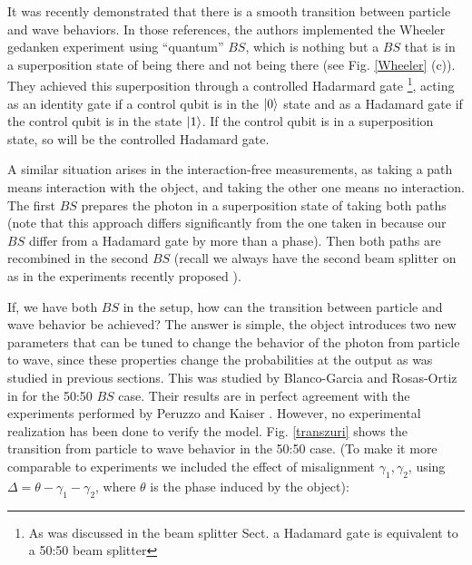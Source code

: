 \documentclass[12pt]{book}
\begin{document}
It was recently demonstrated \cite{Peruzzo, Kaiser2012} that there is a smooth transition between particle and wave behaviors. In those references, the authors implemented the Wheeler gedanken experiment using ``quantum'' $BS$, which is nothing but a $BS$ that is in a superposition state of being there and not being there (see Fig. \ref{Wheeler} (c)). They achieved this superposition through a controlled Hadarmard gate \footnote{As was discussed in the beam splitter Sect. a Hadamard gate is equivalent to a 50:50 beam splitter}, acting as an identity gate if a control qubit is in the $\ket{0}$ state and as a Hadamard gate if the control qubit is in the state $\ket{1}$.  If the control qubit is in a superposition state, so will be the controlled Hadamard gate.




A similar situation arises in the interaction-free measurements, as taking a path means interaction with the object, and taking the other one means no interaction. The first $BS$ prepares the photon in a superposition state of taking both paths (note that this approach differs significantly from the one taken in \cite{Peruzzo,Kaiser2012} because our $BS$ differ from a Hadamard gate by more than a phase). Then both paths are recombined in the second $BS$ (recall we always have the second beam splitter on as in the experiments recently proposed \cite{Polino}).


If, we have both $BS$ in the setup, how can the transition between particle and wave behavior be achieved? The answer is simple, the object introduces two new parameters that can be tuned to change the behavior of the photon from particle to wave, since these properties change the probabilities at the output as was studied in previous sections. This was studied by Blanco-Garcia and  Rosas-Ortiz in \cite{azuri} for the 50:50 $BS$ case. Their results are in perfect agreement with the experiments performed by Peruzzo \cite{Peruzzo} and Kaiser \cite{Kaiser2012}. However, no experimental realization has been done to verify the model. Fig. \ref{transzuri} shows the transition from particle to wave behavior in the 50:50 case. (To make it more comparable to experiments we included the effect of misalignment $\gamma_{1},\gamma_{2}$, using $\Delta=\theta-\gamma_{1}-\gamma_{2}$, where $\theta$ is the phase induced by the object):
\end{document}

